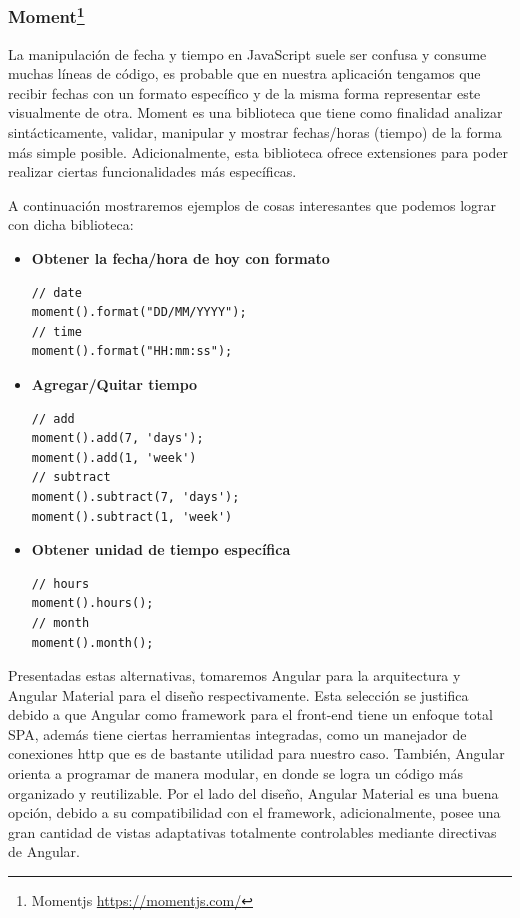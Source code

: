 \subsubsection[Moment]{Moment\footnote{Momentjs \url{https://momentjs.com/}}}

La manipulación de fecha y tiempo en JavaScript suele ser confusa y consume muchas líneas de código, es probable que en nuestra aplicación tengamos que recibir fechas con un formato específico y de la misma forma representar este visualmente de otra. Moment es una biblioteca que tiene como finalidad analizar sintácticamente, validar, manipular y mostrar fechas/horas (tiempo) de la forma más simple posible. Adicionalmente, esta biblioteca ofrece extensiones para poder realizar ciertas funcionalidades más específicas.

A continuación mostraremos ejemplos de cosas interesantes que podemos lograr con dicha biblioteca:

\begin{itemize}
\item\textbf{Obtener la fecha/hora de hoy con formato}
\begin{verbatim}
// date
moment().format("DD/MM/YYYY");
// time
moment().format("HH:mm:ss");
\end{verbatim}

\item\textbf{Agregar/Quitar tiempo}
\begin{verbatim}
// add
moment().add(7, 'days');
moment().add(1, 'week')
// subtract
moment().subtract(7, 'days');
moment().subtract(1, 'week')
\end{verbatim}

\item\textbf{Obtener unidad de tiempo específica}
\begin{verbatim}
// hours
moment().hours();
// month
moment().month();
\end{verbatim}
\end{itemize}

\bigbreak
Presentadas estas alternativas, tomaremos Angular para la arquitectura y Angular Material para el diseño respectivamente. Esta selección se justifica debido a que Angular como framework para el front-end tiene un enfoque total SPA, además tiene ciertas herramientas integradas, como un manejador de conexiones http que es de bastante utilidad para nuestro caso. También, Angular orienta a programar de manera modular, en donde se logra un código más organizado y reutilizable. Por el lado del diseño, Angular Material es una buena opción, debido a su compatibilidad con el framework, adicionalmente, posee una gran cantidad de vistas adaptativas totalmente controlables mediante directivas de Angular.